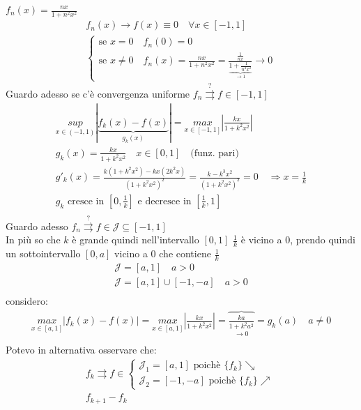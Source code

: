\documentclass[a4paper, oneside]{article}
\begin{document}
\begin{example}
  $f_n(x) = \frac{nx}{1+n^2x^2}$\\
  \begin{gather*}
    f_n(x) \to f(x) \equiv 0 \quad \forall x \in [-1,1]\\
    \begin{cases}
      \text{se } x = 0 \quad f_n(0) = 0 \\
      \text{se } x \neq 0 \quad f_n(x) = \frac{nx}{1+n^2x^2} = \frac{\frac{1}{nx}}{\underbrace{1+\frac{1}{n^2x^2}}_{\to 1}} \to 0
    \end{cases}
  \end{gather*}
  Guardo adesso se c'è convergenza uniforme $f_n \overset{?}{\rightrightarrows} f \in [-1,1]$
  \begin{gather*}
    \underset{x \in (-1,1)}{sup} |\underbrace{f_k(x) - f(x)}_{g_k(x)}| = \underset{x \in [-1,1]}{max} \left\lvert \frac{kx}{1+k^2x^2} \right\rvert\\
    g_k(x) = \frac{kx}{1+k^2x^2} \quad x \in [0,1] \quad \text{(funz. pari)}\\
    g'_k(x) = \frac{k(1+k^2x^2) - kx(2k^2x)}{(1+k^2x^2)^2} = \frac{k - k^3x^2}{(1+k^2x^2)^2} = 0 \quad \Rightarrow x = \frac{1}{k}\\
    g_k \text{ cresce in } \left[0, \frac{1}{k}\right] \text{ e decresce in } \left[\frac{1}{k}, 1\right]\\
  \end{gather*}
  Guardo adesso $f_n \overset{?}{\rightrightarrows} f \in \mathcal{J} \subseteq [-1,1]$\\
  In più so che $k$ è grande quindi nell'intervallo $[0,1]$ $\frac{1}{k}$ è vicino a $0$, prendo quindi un sottointervallo $[0,a]$ vicino a $0$ che contiene $\frac{1}{k}$
  \begin{gather*}
    \mathcal{J} = [a,1] \quad a > 0\\
    \mathcal{J} = [a,1] \cup [-1,-a] \quad a>0\\
  \end{gather*}
  considero:
  \begin{gather*}
    \underset{x \in [a,1]}{max} \left\lvert f_k(x) - f(x) \right\rvert = \underset{x \in [a,1]}{max} \left\lvert \frac{kx}{1+k^2x^2} \right\rvert = \overbrace{\frac{ka}{1+k^2a^2}}_{\to 0} = g_k(a) \quad a \neq 0\\ 
  \end{gather*}
  Potevo in alternativa osservare che:
  \begin{gather*}
    f_k \rightrightarrows f \in \begin{cases}
      \mathcal{J}_1 = [a,1] \text{ poichè } \{f_k\} \searrow \\
      \mathcal{J}_2 = [-1,-a] \text{ poichè } \{f_k\} \nearrow
    \end{cases}\\
    f_{k+1} - f_k
  \end{gather*}
\end{example}
\end{document}
